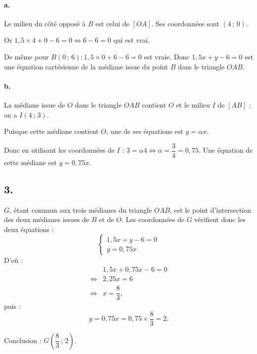 \paragraph{a.} Le milieu du côté opposé à \( B \) est celui de \([OA]\). Ses coordonnées sont \( (4 \,;\, 0) \).

Or \( 1{,}5 \times 4 + 0 - 6 = 0 \iff 6 - 6 = 0 \) qui est vrai.

De même pour \( B(0 \,;\, 6) : 1{,}5 \times 0 + 6 - 6 = 0 \) est vraie. Donc \( 1{,}5x + y - 6 = 0 \) est une équation cartésienne de la médiane issue du point \( B \) dans le triangle \( OAB \).

\paragraph{b.} La médiane issue de \( O \) dans le triangle \( OAB \) contient \( O \) et le milieu \( I \) de \([AB]\) ; on a \( I(4 \,;\, 3) \).

Puisque cette médiane contient \( O \), une de ses équations est \( y = \alpha x \).

Donc en utilisant les coordonnées de \( I \) : \( 3 = \alpha 4 \iff \alpha = \dfrac{3}{4} = 0{,}75 \). Une équation de cette médiane est \( y = 0{,}75x \).

\subsection*{3.}

\( G \), étant commun aux trois médianes du triangle \( OAB \), est le point d'intersection des deux médianes issues de \( B \) et de \( O \). Les coordonnées de \( G \) vérifient donc les deux équations :
\[
\begin{cases}
1{,}5x + y - 6 = 0 \\
y = 0{,}75x
\end{cases}
\]
D'où :
\begin{align*}
&1{,}5x + 0{,}75x - 6 = 0 \\
\iff &2{,}25x = 6 \\
\iff &x = \dfrac{8}{3},
\end{align*}
puis :
\[
y = 0{,}75x = 0{,}75 \times \dfrac{8}{3} = 2.
\]

Conclusion : \( G\left(\dfrac{8}{3} \,;\, 2\right) \).
